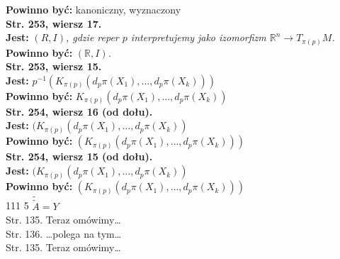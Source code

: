 \documentclass[a4paper,11pt]{article}
\newcommand{\mb}{\mathbb}
\newcommand{\ra}{\rightarrow}
\newcommand{\ld}{\ldots}
\newcommand{\R}{\mb{R}}
\newcommand{\wt}{\widetilde}
\newcommand{\tb}{\textbf}
\newcommand{\StrWg}[2]{\tb{Str. #1, wiersz #2.}}
\newcommand{\StrWd}[2]{\tb{Str. #1, wiersz #2 (od dołu).}}
\newcommand{\Jest}{\tb{Jest: }}
\newcommand{\Pow}{\tb{Powinno być: }}
\begin{document}
\Pow  kanoniczny, wyznaczony \\
\StrWg{253}{17} \\
\Jest \emph{$( R, I )$, gdzie reper $p$ interpretujemy jako izomorfizm
  $\R^{ n } \ra T_{ \pi( p ) }M$.} \\
\Pow \emph{$( \R, I )$.} \\
\StrWg{253}{15} \\
\Jest $p^{ -1 }( K_{ \pi( p ) }( d_{ p }\pi( X_{ 1 } ), \ld, d_{ p }\pi( X_{ k } ) ) )$ \\
\Pow  $K_{ \pi( p ) }( d_{ p }\pi( X_{ 1 } ), \ld, d_{ p }\pi( X_{ k } ) )$ \\
\StrWd{254}{16} \\
\Jest $( K_{ \pi( p ) }( d_{ p }\pi( X_{ 1 } ), \ld,
d_{ p }\pi( X_{ k } ) )$ \\
\Pow $( K_{ \pi( p ) }( d_{ p }\pi( X_{ 1 } ), \ld,
d_{ p }\pi( X_{ k } ) ) )$ \\
\StrWd{254}{15} \\
\Jest $( K_{ \pi( p ) }( d_{ p }\pi( X_{ 1 } ), \ld,
d_{ p }\pi( X_{ k } ) )$ \\
\Pow $( K_{ \pi( p ) }( d_{ p }\pi( X_{ 1 } ), \ld,
d_{ p }\pi( X_{ k } ) ) )$ \\


111 5 $\wt{ \wt{ A } } = Y$ \\
Str. 135. Teraz omówimy\ld \\
Str. 136. \ldots polega na tym\ld \\
Str. 135. Teraz omówimy\ld \\





 {}



\end{document}
